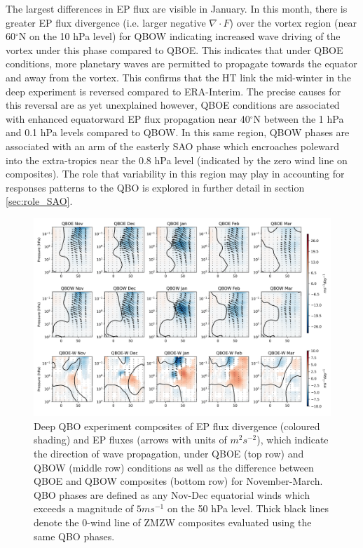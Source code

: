 The largest differences in EP flux are visible in January. In this month,
there is greater EP flux divergence (i.e. larger negative $\nabla \cdot F$) over the vortex region (near 60$^\circ$N on the 10 hPa level) for QBOW indicating increased wave driving of the vortex under this phase compared to QBOE. This indicates that under QBOE conditions, more planetary waves are permitted to propagate towards the equator and away from the vortex. This confirms that the HT link the mid-winter in the deep experiment is reversed compared to ERA-Interim. The precise causes for this reversal are as yet unexplained however, QBOE conditions are associated with enhanced equatorward EP flux propagation near 40$^\circ$N between the 1 hPa and 0.1 hPa levels compared to QBOW. In this same region, QBOW phases are associated with an arm of the easterly SAO phase which encroaches poleward into the extra-tropics near the 0.8 hPa level (indicated by the zero wind line on composites). The role that variability in this region may play in accounting for responses patterns to the QBO is explored in further detail in section \ref{sec:role_SAO}.
\newpage
\begin{figure}[h!]
\begin{center}
\noindent\includegraphics[width = \linewidth]{Figures/Figures-deepQBO/EP_flux_composites_by_month_QBO_phases_d_higher_50hPa_5thresh.png}
\caption[EP flux composites under different QBO phases in the deep QBO simulation]{Deep QBO experiment composites of EP flux divergence (coloured shading) and EP fluxes (arrows with units of $m^2s^{-2}$), which indicate the direction of wave propagation, under QBOE (top row) and QBOW (middle row) conditions as well as the difference between QBOE and QBOW composites (bottom row) for November-March. QBO phases are defined as any Nov-Dec equatorial winds which exceeds a magnitude of $5ms^{-1}$ on the 50 hPa level. Thick black lines denote the 0-wind line of ZMZW composites evaluated using the same QBO phases.}
\label{fig:EP_deep}
\end{center}
\end{figure}

